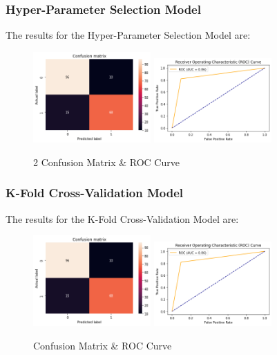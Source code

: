 \documentclass[conference]{IEEEtran}
\begin{document}
\subsubsection{Hyper-Parameter Selection Model}

The results for the Hyper-Parameter Selection Model are:

\begin{figure}[h!]
    \includegraphics[width=4.5cm]{NN/nn2_1.png}%
    \includegraphics[width=4.5cm]{NN/nn2_2.png}%
    \caption{2 Confusion Matrix & ROC Curve}%
    \label{fig:conf_NN_2}%
\end{figure}

\subsubsection{K-Fold Cross-Validation Model}

The results for the K-Fold Cross-Validation Model are:

\begin{figure}[h!]
    \includegraphics[width=4.5cm]{NN/nn3_1.png}%
    \includegraphics[width=4.5cm]{NN/nn3_2.png}%
    \caption{Confusion Matrix & ROC Curve}%
    \label{fig:conf_NN_3}%
\end{figure}
\end{document}
